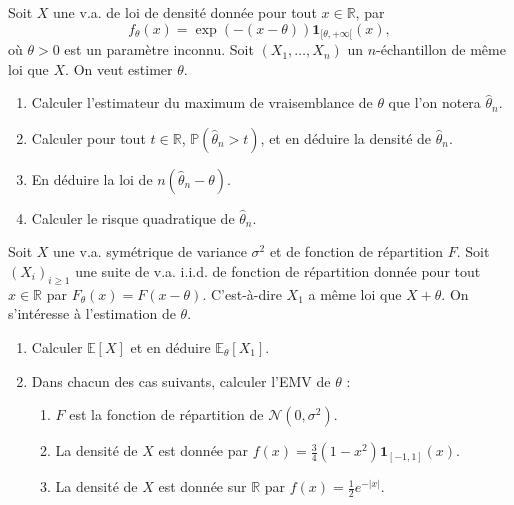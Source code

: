\begin{mdframed}
\begin{exercice}
Soit $X$ une v.a. de loi de densité donnée pour tout $x \in \mathbb{R}$, par
\begin{equation*}
f_\theta(x) = \exp(-(x - \theta))\mathbf{1}_{[\theta, +\infty[} (x),
\end{equation*}
où $\theta > 0$ est un paramètre inconnu. Soit $(X_1, \dots, X_n)$ un $n$-échantillon de même loi que $X$. On veut estimer $\theta$.
\begin{enumerate}
    \item Calculer l'estimateur du maximum de vraisemblance de $\theta$ que l'on notera $\hat{\theta}_n$.
    \item Calculer pour tout $t \in \mathbb{R}$, $\mathbb{P}(\hat{\theta}_n > t)$, et en déduire la densité de $\hat{\theta}_n$.
    \item En déduire la loi de $n(\hat{\theta}_n - \theta)$.
    \item Calculer le risque quadratique de $\hat{\theta}_n$.
\end{enumerate}
\end{exercice}
\end{mdframed}

\smallskip

\begin{mdframed}
\begin{exercice}
Soit $X$ une v.a. symétrique de variance $\sigma^2$ et de fonction de répartition $F$. Soit $(X_i)_{i \ge 1}$ une suite de v.a. i.i.d. de fonction de répartition donnée pour tout $x \in \mathbb{R}$ par $F_\theta(x) = F(x - \theta)$. C'est-à-dire $X_1$ a même loi que $X + \theta$. On s'intéresse à l'estimation de $\theta$.
\begin{enumerate}
    \item Calculer $\mathbb{E}[X]$ et en déduire $\mathbb{E}_\theta[X_1]$.
    \item Dans chacun des cas suivants, calculer l'EMV de $\theta$ :
    \begin{enumerate}
        \item[i--] $F$ est la fonction de répartition de $\mathcal{N}(0, \sigma^2)$.
        \item[ii--] La densité de $X$ est donnée par $f(x) = \frac{3}{4}(1 - x^2)\mathbf{1}_{[-1, 1]}(x)$.
        \item[iii--] La densité de $X$ est donnée sur $\mathbb{R}$ par $f(x) = \frac{1}{2} e^{-|x|}$.
    \end{enumerate}
\end{enumerate}
\end{exercice}
\end{mdframed}

